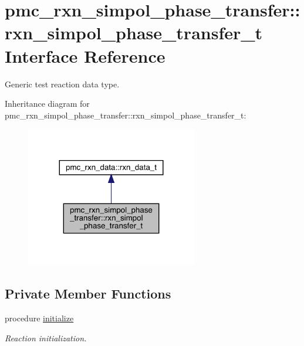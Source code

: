\hypertarget{structpmc__rxn__simpol__phase__transfer_1_1rxn__simpol__phase__transfer__t}{}\section{pmc\+\_\+rxn\+\_\+simpol\+\_\+phase\+\_\+transfer\+:\+:rxn\+\_\+simpol\+\_\+phase\+\_\+transfer\+\_\+t Interface Reference}
\label{structpmc__rxn__simpol__phase__transfer_1_1rxn__simpol__phase__transfer__t}


Generic test reaction data type.  




Inheritance diagram for pmc\+\_\+rxn\+\_\+simpol\+\_\+phase\+\_\+transfer\+:\+:rxn\+\_\+simpol\+\_\+phase\+\_\+transfer\+\_\+t\+:\nopagebreak
\begin{figure}[H]
\begin{center}
\leavevmode
\includegraphics[width=212pt]{structpmc__rxn__simpol__phase__transfer_1_1rxn__simpol__phase__transfer__t__inherit__graph}
\end{center}
\end{figure}
\subsection*{Private Member Functions}
\begin{DoxyCompactItemize}
\item 
procedure \mbox{\hyperlink{structpmc__rxn__simpol__phase__transfer_1_1rxn__simpol__phase__transfer__t_a284e2fb2a45914f13dcdcf9d5521e9bc}{initialize}}
\begin{DoxyCompactList}\small\item\em Reaction initialization. \end{DoxyCompactList}\end{DoxyCompactItemize}

